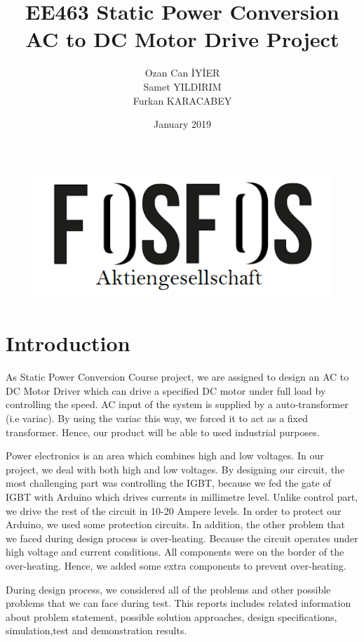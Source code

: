 \documentclass{article}
\title{ EE463 Static Power Conversion \\AC to DC Motor Drive Project}
\author{Ozan Can İYİER\\Samet YILDIRIM\\Furkan KARACABEY }
\date{January 2019}
\begin{document}
\maketitle

\begin{figure}[h!]
\centering
\includegraphics[scale=1]{logo.png}
\label{fig:members}
\end{figure}
\newpage
\tableofcontents
\newpage
\section{Introduction}

As Static Power Conversion Course project, we are assigned to design an AC to DC Motor Driver which can drive a specified DC motor under full load by controlling the speed. AC input of the system is supplied by a auto-transformer (i.e variac). By using the variac this way, we forced it to act as a fixed transformer. Hence, our product will be able to used industrial purposes.
\par Power electronics is an area which combines high and low voltages. In our project, we deal with both high and low voltages. By designing our circuit, the most challenging part was controlling the IGBT, because we fed the gate of IGBT with Arduino which drives currents in millimetre level. Unlike control part, we drive the rest of the circuit in 10-20 Ampere levels. In order to protect our Arduino, we used some protection circuits. In addition, the other problem that we faced during design process is over-heating. Because the circuit operates under high voltage and current conditions. All components were on the border of the over-heating. Hence, we added some extra components to prevent over-heating.
\par During design process, we considered all of the problems and other possible problems that we can face during test. This reports includes related information about problem statement, possible solution approaches, design specifications, simulation,test and demonstration results. 
\end{document}
